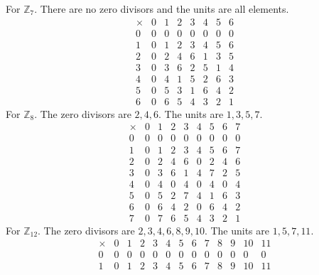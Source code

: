   \begin{exercise}[Shifrin 1.4.1]
    For $\mathbb{Z}_7$. There are no zero divisors and the units are all elements. 
    \begin{equation}
      \begin{array}{c|ccccccc}
        \times & 0 & 1 & 2 & 3 & 4 & 5 & 6 \\
        \hline
        0 & 0 & 0 & 0 & 0 & 0 & 0 & 0 \\
        1 & 0 & 1 & 2 & 3 & 4 & 5 & 6 \\
        2 & 0 & 2 & 4 & 6 & 1 & 3 & 5 \\
        3 & 0 & 3 & 6 & 2 & 5 & 1 & 4 \\
        4 & 0 & 4 & 1 & 5 & 2 & 6 & 3 \\
        5 & 0 & 5 & 3 & 1 & 6 & 4 & 2 \\
        6 & 0 & 6 & 5 & 4 & 3 & 2 & 1
      \end{array}
    \end{equation}
    For $\mathbb{Z}_8$. The zero divisors are $2, 4, 6$. The units are $1, 3, 5, 7$. 
    \begin{equation}
      \begin{array}{c|cccccccc}
        \times & 0 & 1 & 2 & 3 & 4 & 5 & 6 & 7 \\
        \hline
        0 & 0 & 0 & 0 & 0 & 0 & 0 & 0 & 0 \\
        1 & 0 & 1 & 2 & 3 & 4 & 5 & 6 & 7 \\
        2 & 0 & 2 & 4 & 6 & 0 & 2 & 4 & 6 \\
        3 & 0 & 3 & 6 & 1 & 4 & 7 & 2 & 5 \\
        4 & 0 & 4 & 0 & 4 & 0 & 4 & 0 & 4 \\
        5 & 0 & 5 & 2 & 7 & 4 & 1 & 6 & 3 \\
        6 & 0 & 6 & 4 & 2 & 0 & 6 & 4 & 2 \\
        7 & 0 & 7 & 6 & 5 & 4 & 3 & 2 & 1
      \end{array} 
    \end{equation}
    For $\mathbb{Z}_{12}$. The zero divisors are $2, 3, 4, 6, 8, 9, 10$. The units are $1, 5, 7, 11$. 
    \begin{equation}
      \begin{array}{c|cccccccccccc}
        \times & 0 & 1 & 2 & 3 & 4 & 5 & 6 & 7 & 8 & 9 & 10 & 11 \\
        \hline
        0 & 0 & 0 & 0 & 0 & 0 & 0 & 0 & 0 & 0 & 0 & 0 & 0 \\
        1 & 0 & 1 & 2 & 3 & 4 & 5 & 6 & 7 & 8 & 9 & 10 & 11 \\

\end{array}
\end{equation}
\end{exercise}
